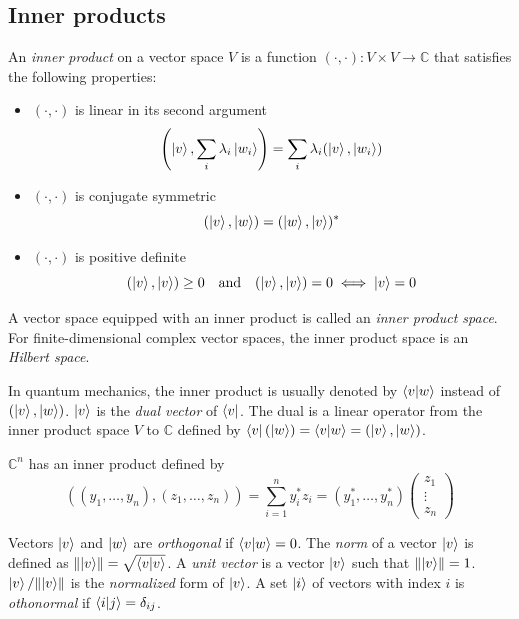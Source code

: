 \subsection{Inner products}
An \emph{inner product} on a vector space $V$ is a function $(\cdot, \cdot): V \times V \to \mathbb{C}$ that satisfies the following properties:
\begin{itemize}
    \item $(\cdot, \cdot)$ is linear in its second argument
        \[
            \left(\ket{v}, \sum_i \lambda_i \ket{w_i}\right) = \sum_i \lambda_i (\ket{v}, \ket{w_i})
        \]
    \item $(\cdot, \cdot)$ is conjugate symmetric
        \[
            (\ket{v}, \ket{w}) = (\ket{w}, \ket{v})^*
        \]
    \item $(\cdot, \cdot)$ is positive definite
        \[
            (\ket{v}, \ket{v}) \geq 0 \quad \text{and} \quad (\ket{v}, \ket{v}) = 0 \iff \ket{v} = 0
        \]
\end{itemize}

A vector space equipped with an inner product is called an \emph{inner product space}.
For finite-dimensional complex vector spaces, the inner product space is an \emph{Hilbert space}.

In quantum mechanics, the inner product is usually denoted by $\braket{v|w}$ instead of $(\ket{v}, \ket{w})$. 
$\ket{v}$ is the \emph{dual vector} of $\bra{v}$.
The dual is a linear operator from the inner product space $V$ to $\mathbb{C}$ defined by $\bra{v}(\ket{w}) = \braket{v|w} = (\ket{v}, \ket{w})$.

$\mathbb{C}^n$ has an inner product defined by
\[
    \left((y_1, \ldots, y_n), (z_1, \ldots, z_n)\right) = \sum_{i=1}^n y_i^* z_i = (y^*_1, \ldots, y^*_n)\begin{pmatrix}
        z_1 \\
        \vdots \\
        z_n
\end{pmatrix}
\]

Vectors $\ket{v}$ and $\ket{w}$ are \emph{orthogonal} if $\braket{v|w} = 0$.
The \emph{norm} of a vector $\ket{v}$ is defined as $\lVert\ket{v}\rVert = \sqrt{\braket{v|v}}$.
A \emph{unit vector} is a vector $\ket{v}$ such that $\lVert\ket{v}\rVert = 1$.
$\ket{v}/\lVert\ket{v}\rVert$ is the \emph{normalized} form of $\ket{v}$.
A set $\ket{i}$ of vectors with index $i$ is \emph{othonormal} if $\braket{i|j} = \delta_{ij}$.


